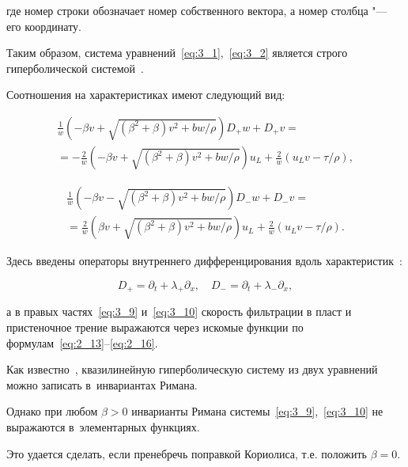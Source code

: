 где номер строки обозначает номер собственного вектора, а номер столбца "--- его координату. 

Таким образом, система уравнений~\eqref{eq:3_1},~\eqref{eq:3_2} является строго гиперболической системой~\cite{kulik1}.



Соотношения на характеристиках имеют следующий вид:

\begin{multline}

\frac{1}{w}\left(-\beta v + \sqrt{\left(\beta^2 + \beta\right) v^2 + {bw}/{\rho}}\right) D_+ w + D_+ v  = 

\\

 = -\frac{2}{w}\left(-\beta v + \sqrt{\left(\beta^2 + \beta\right) v^2 + {bw}/{\rho}}\right) u_L + \frac{2}{w} \left(u_L v - {\tau}/{\rho}\right), \label{eq:3_9} 

\end{multline}

\begin{multline}

\frac{1}{w}\left(-\beta v - \sqrt{\left(\beta^2 + \beta\right) v^2 + {bw}/{\rho}}\right) D_- w + D_- v  = \\

 = \frac{2}{w}\left(\beta v + \sqrt{\left(\beta^2 + \beta\right) v^2 + {bw}/{\rho}}\right) u_L + \frac{2}{w} \left(u_L v - {\tau}/{\rho}\right). \label{eq:3_10} 

\end{multline}

Здесь введены операторы внутреннего дифференцирования вдоль характеристик~\cite{ovsyan1}:

$$

 D_+= \partial_t + \lambda_+\partial_x, \quad  D_- = \partial_t + \lambda_-\partial_x, 

$$

а в правых частях~\eqref{eq:3_9} и~\eqref{eq:3_10} скорость фильтрации в пласт и пристеночное трение выражаются через искомые функции по формулам~\eqref{eq:2_13}--\eqref{eq:2_16}.



Как известно~\cite{rozhd1}, квазилинейную гиперболическую систему из двух уравнений можно записать в~инвариантах Римана. 

Однако при любом $\beta >0$ инварианты Римана системы~\eqref{eq:3_9},~\eqref{eq:3_10} не выражаются в~элементарных функциях. 

Это удается сделать, если пренебречь поправкой Кориолиса, т.е. положить $\beta = 0$. 


